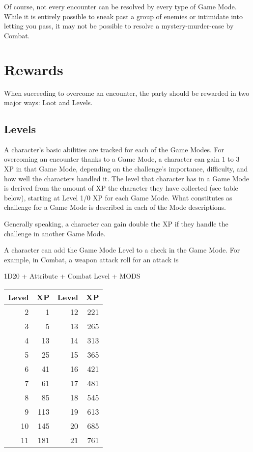 Of course, not every encounter can be resolved by every type of Game Mode. 
While it is entirely possible to sneak past a group of enemies or intimidate into letting you pass, it may not be possible to resolve a mystery-murder-case by Combat.

\section{Rewards}\label{sec:rewards}
When succeeding to overcome an encounter, the party should be rewarded in two major ways: Loot and Levels.

\subsection{Levels}\label{subsec:levels}
A character’s basic abilities are tracked for each of the Game Modes.
For overcoming an encounter thanks to a Game Mode, a character can gain 1 to 3 XP in that Game Mode, depending on the challenge’s importance, difficulty, and how well the characters handled it.
The level that character has in a Game Mode is derived from the amount of XP the character they have collected (see table below), starting at Level 1/0 XP for each Game Mode.
What constitutes as challenge for a Game Mode is described in each of the Mode descriptions.

Generally speaking, a character can gain double the XP if they handle the challenge in another Game Mode.

A character can add the Game Mode Level to a check in the Game Mode.
For example, in Combat, a weapon attack roll for an attack is \\
\begin{center}
	
1D20 + Attribute + Combat Level + MODS\\

\begin{tabular}{r r | r r}
Level & XP & Level & XP\\ \hline
2 & 1 & 12 & 221\\
3 & 5 & 13 & 265\\
4 & 13 & 14 & 313\\
5 & 25 & 15 & 365\\
6 & 41 & 16 & 421\\
7 & 61 & 17 & 481\\
8 & 85 & 18 & 545\\
9 & 113 & 19 & 613\\
10 & 145 & 20 & 685\\
11 & 181 & 21 & 761\\
\end{tabular}\\~\\

\end{center}

